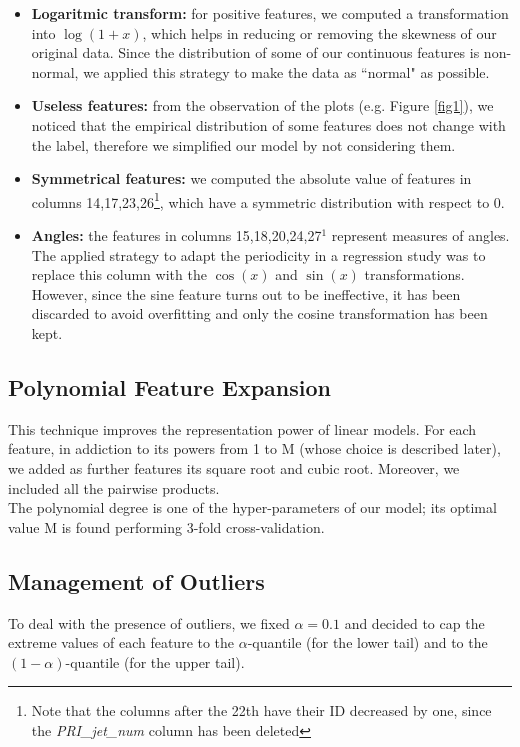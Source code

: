 \documentclass[10pt,conference,compsocconf]{IEEEtran}
\begin{document}
\begin{itemize}
    \item \textbf{Logaritmic transform:} for positive features, we computed a transformation into $\log(1+x)$, which helps in reducing or removing the skewness of our original data. Since the distribution of some of our continuous features is non-normal, we applied this strategy to make the data as ``normal" as possible. 
    \item \textbf{Useless features:} from the observation of the plots (e.g. Figure \ref{fig1}), we noticed that the empirical distribution of some features does not change with the label, therefore we simplified our model by not considering them.
    \item \textbf{Symmetrical features:} we computed the absolute value of features in columns 14,17,23,26\footnote{\label{note1}Note that the columns after the 22th have their ID decreased by one, since the \emph{PRI\_jet\_num} column has been deleted}, which have a symmetric distribution with respect to 0.
    \item \textbf{Angles:} the features in columns 15,18,20,24,27$^{\hyperref[note1]{1}}$ represent measures of angles. The applied strategy to adapt the periodicity in a regression study was to replace this column with the $\cos(x)$ and $\sin(x)$ transformations. However, since the sine feature turns out to be ineffective, it has been discarded to avoid overfitting and only the cosine transformation has been kept.
\end{itemize}

\subsection{Polynomial Feature Expansion}
This technique improves the representation power of linear models. For each feature, in addiction to its powers from 1 to M (whose choice is described later), we added as further features its square root and cubic root.
Moreover, we included all the pairwise products.\\
The polynomial degree is one of the hyper-parameters of our model; its optimal value M is found performing 3-fold cross-validation.

\subsection{Management of Outliers}
To deal with the presence of outliers, we fixed $\alpha = 0.1$ and decided to cap the extreme values of each feature to the $\alpha$-quantile (for the lower tail) and to the $(1-\alpha)$-quantile (for the upper tail).
\end{document}
